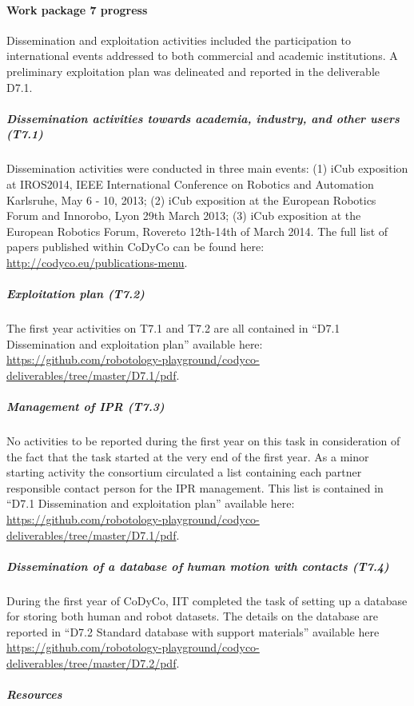 \documentclass[12pt,a4paper,twoside]{article}
\begin{document}
\paragraph{Work package 7 progress}

Dissemination and exploitation activities included the participation to international events addressed to both commercial and academic institutions. A preliminary exploitation plan was delineated and reported in the deliverable D7.1.

\subparagraph{Dissemination activities towards academia, industry, and other users (T7.1)}

Dissemination activities were conducted in three main events: (1) iCub exposition at IROS2014, IEEE International Conference on Robotics and Automation Karlsruhe, May 6 - 10, 2013; (2) iCub exposition at the European Robotics Forum and Innorobo, Lyon 29th March 2013; (3) iCub exposition at the European Robotics Forum, Rovereto 12th-14th of March 2014. The full list of papers published within CoDyCo can be found here: \url{http://codyco.eu/publications-menu}.

\subparagraph{Exploitation plan (T7.2)}

The first year activities on T7.1 and T7.2 are all contained in ``D7.1 Dissemination and exploitation plan'' available here: \url{https://github.com/robotology-playground/codyco-deliverables/tree/master/D7.1/pdf}.

\subparagraph{Management of IPR (T7.3)}

No activities to be reported during the first year on this task in consideration of the fact that the task started at the very end of the first year. As a minor starting activity the consortium circulated a list containing each partner responsible contact person for the IPR management. This list is contained in ``D7.1 Dissemination and exploitation plan'' available here: \url{https://github.com/robotology-playground/codyco-deliverables/tree/master/D7.1/pdf}.

\subparagraph{Dissemination of a database of human motion with contacts (T7.4)}

During the first year of CoDyCo, IIT completed the task of setting up a database for storing both human and robot datasets. The details on the database are reported in ``D7.2 Standard database with support materials'' available here \url{https://github.com/robotology-playground/codyco-deliverables/tree/master/D7.2/pdf}. 

\subparagraph{Resources}
\end{document}
